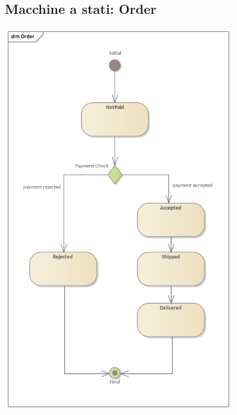 \subsection{Macchine a stati: Order}
\begin{center}
  \includegraphics[width=0.75\textwidth]{immagini/Progettazione/MachineStateDiagrams/Order.png}
\end{center}

